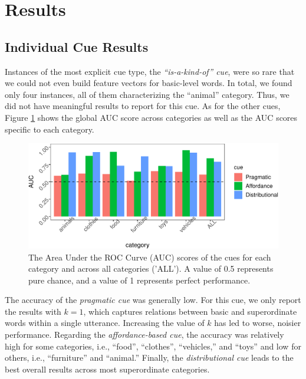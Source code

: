 \documentclass[english,,man]{apa6}
\begin{document}
\hypertarget{results}{%
\section{Results}\label{results}}

\hypertarget{individual-cue-results}{%
\subsection{Individual Cue Results}\label{individual-cue-results}}

Instances of the most explicit cue type, the \emph{\enquote{is-a-kind-of} cue}, were so rare that we could not even build feature vectors for basic-level words. In total, we found only four instances, all of them characterizing the \enquote{animal} category. Thus, we did not have meaningful results to report for this cue. As for the other cues, Figure \ref{fig:data-all} shows the global AUC score across categories as well as the AUC scores specific to each category.

\begin{figure}[h]

{\centering \includegraphics{child_language_journal_files/figure-latex/data-all-1} 

}

\caption{\label{fig:data-all} The Area Under the ROC Curve (AUC) scores of the cues for each category and across all categories ('ALL'). A value of 0.5 represents pure chance, and a value of 1 represents perfect performance.}\label{fig:data-all}
\end{figure}

The accuracy of the \emph{pragmatic cue} was generally low. For this cue, we only report the results with \(k=1\), which captures relations between basic and superordinate words within a single utterance. Increasing the value of \(k\) has led to worse, noisier performance. Regarding the \emph{affordance-based cue}, the accuracy was relatively high for some categories, i.e., \enquote{food}, \enquote{clothes}, \enquote{vehicles,} and \enquote{toys} and low for others, i.e., \enquote{furniture} and \enquote{animal.} Finally, the \emph{distributional cue} leads to the best overall results across most superordinate categories.
\end{document}
